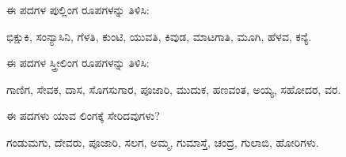 \vspace{2.5pt plus 3pt minus 0.5pt}\noindent\hspace*{1.2em}\hspace{0.55em}ಈ ಪದಗಳ ಪುಲ್ಲಿಂಗ ರೂಪಗಳನ್ನು ತಿಳಿಸಿ:\par

\indent ಭಿಕ್ಷುಕಿ, ಸಂನ್ಯಾಸಿನಿ, ಗೆಳತಿ, ಕುಂಟಿ, ಯುವತಿ, ಕಿವುಡ, ಮಾಟಗಾತಿ, ಮೂಗಿ, ಹೆಳವ, ಕನ್ಯೆ.\par

\vspace{2.5pt plus 3pt minus 0.5pt}\noindent\hspace*{1.2em}\hspace{0.55em}ಈ ಪದಗಳ ಸ್ತ್ರೀಲಿಂಗ ರೂಪಗಳನ್ನು ತಿಳಿಸಿ:\par

\indent ಗಾಣಿಗ, ಸೇವಕ, ದಾಸ, ಸೊಗಸುಗಾರ, ಪೂಜಾರಿ, ಮುದುಕ, ಹಣವಂತ, ಅಯ್ಯ, ಸಹೋದರ, ವರ.\par

\vspace{2.5pt plus 3pt minus 0.5pt}\noindent\hspace*{1.2em}\hspace{0.55em}ಈ ಪದಗಳು ಯಾವ ಲಿಂಗಕ್ಕೆ ಸೇರಿದವುಗಳು?\par

\indent ಗಂಡುಮಗು, ದೇವರು, ಪೂಜಾರಿ, ಸಲಗ, ಅಮ್ಮ, ಗುಮಾಸ್ತೆ, ಚಂದ್ರ, ಗುಲಾಬಿ, ಹೋರಿಗಳು.\par
